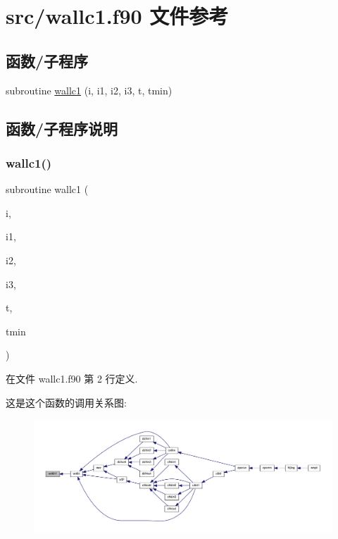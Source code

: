 \hypertarget{wallc1_8f90}{}\section{src/wallc1.f90 文件参考}
\label{wallc1_8f90}
\subsection*{函数/子程序}
\begin{DoxyCompactItemize}
\item 
subroutine \mbox{\hyperlink{wallc1_8f90_a733b88c22f3ac761647ce485df09f191}{wallc1}} (i, i1, i2, i3, t, tmin)
\end{DoxyCompactItemize}


\subsection{函数/子程序说明}
\mbox{\label{wallc1_8f90_a733b88c22f3ac761647ce485df09f191}} 
\subsubsection{\texorpdfstring{wallc1()}{wallc1()}}
{\footnotesize\ttfamily subroutine wallc1 (\begin{DoxyParamCaption}\item[{}]{i,  }\item[{}]{i1,  }\item[{}]{i2,  }\item[{}]{i3,  }\item[{}]{t,  }\item[{}]{tmin }\end{DoxyParamCaption})}



在文件 wallc1.\+f90 第 2 行定义.

这是这个函数的调用关系图\+:
\nopagebreak
\begin{figure}[H]
\begin{center}
\leavevmode
\includegraphics[width=350pt]{wallc1_8f90_a733b88c22f3ac761647ce485df09f191_icgraph}
\end{center}
\end{figure}
